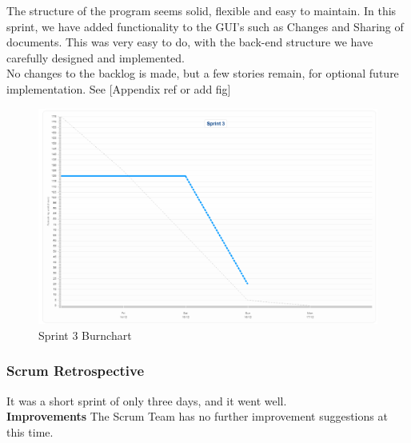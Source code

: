 The structure of the program seems solid, flexible and easy to maintain. In this sprint, we have added functionality to the GUI's such as Changes and Sharing of documents. This was very easy to do, with the back-end structure we have carefully designed and implemented.\\
\newline
No changes to the backlog is made, but a few stories remain, for optional future implementation. See [Appendix ref or add fig]
\begin{figure}[H]
  \includegraphics[width=\textwidth]{illustrations/sprint3burn.PNG}
  \caption{Sprint 3 Burnchart}
  \label{sprint3burnchart}
\end{figure}
\subsubsection{Scrum Retrospective}
It was a short sprint of only three days, and it went well.\\
\newline
\textbf{Improvements}
The Scrum Team has no further improvement suggestions at this time.\\